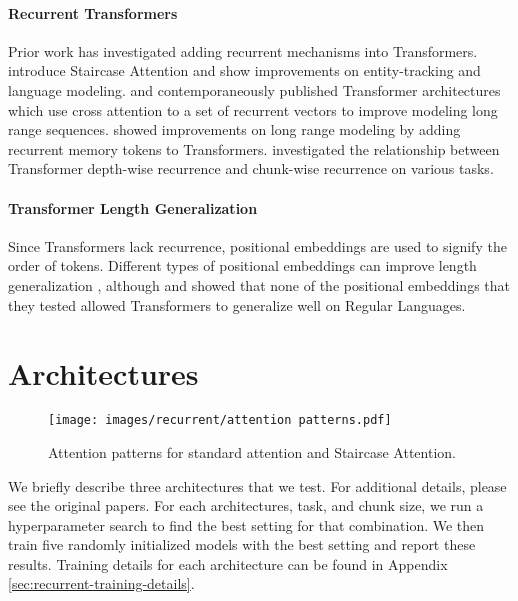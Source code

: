     \paragraph{Recurrent Transformers}
    Prior work has investigated adding recurrent mechanisms into Transformers. \citet{ju_staircase_2022} introduce Staircase Attention and show improvements on entity-tracking and language modeling.  \citet{hutchins_block-recurrent_2022} and \citet{didolkar_temporal_2022} contemporaneously published Transformer architectures which use cross attention to a set of recurrent vectors to improve modeling long range sequences. \citet{bulatov_recurrent_2022} showed improvements on long range modeling by adding recurrent memory tokens to Transformers. \citet{chowdhury_investigating_2024} investigated the relationship between Transformer depth-wise recurrence and chunk-wise recurrence on various tasks.
    
    \paragraph{Transformer Length Generalization}
    Since Transformers lack recurrence, positional embeddings are used to signify the order of tokens. Different types of positional embeddings can improve length generalization \citep{csordas-etal-2021-devil, ruoss-etal-2023-randomized, shaw_self-attention_2018, su_roformer_2024, zhou_transformers_2024, kazemnejad_impact_2023, press_train_2021}, although \citet{deletang_neural_2022} and \citet{ruoss-etal-2023-randomized} showed that none of the positional embeddings that they tested allowed Transformers to generalize well on Regular Languages.
    
    \section{Architectures}
    \begin{figure}[ht]
        \centering
        \texttt{[image: images/recurrent/attention patterns.pdf]}
        \caption{Attention patterns for standard attention and Staircase Attention.}
        \label{fig:attention-patterns}
    \end{figure}
    
    We briefly describe three architectures that we test. For additional details, please see the original papers. For each architectures, task, and chunk size, we run a hyperparameter search to find the best setting for that combination. We then train five randomly initialized models with the best setting and report these results. Training details for each architecture can be found in Appendix \ref{sec:recurrent-training-details}.
    
